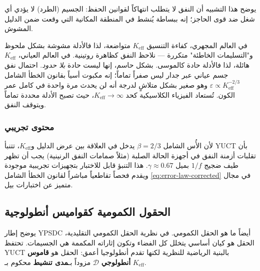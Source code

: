 \documentclass[12pt,a4paper]{article}
\theoremstyle{remark}
\begin{document}
	يوضح هذا التشبيه أن النفق لا يتطلب انتهاكاً لقوانين الحفظ: الجسيم (الطرد) لا يؤدي أي شغل ضد قوى الحاجز؛ إنه ببساطة يُنشط في المنطقة المكانية التي وقعت ضمن الدليل المشوش.
	
	في العالم المجهري، كفاءة التنسيق \(K_{\mathrm{eff}}\) متواضعة، لذا فالأدلة مشوشة بشكل ملحوظ و"التسليمات الخاطئة" متكررة — نلاحظ النفق كظاهرة روتينية. في العالم العياني، \(K_{\mathrm{eff}}\) هائلة، لذا فالأدلة حادة كالموسى. بشكل حاسم، إنها ليست حادة \emph{بلا حدود}. احتمال نفق جسم عياني عبر جدار ليس صفراً تماماً؛ إنه مكبوت أسياً بقانون الخطأ الشامل \(\varepsilon \propto K_{\mathrm{eff}}^{-2/3}\) وهو صغير بشكل متلاشٍ لدرجة أنه لن يحدث مرة واحدة في كامل عمر الكون. تُستعاد الفيزياء الكلاسيكية كحد \(K_{\mathrm{eff}} \to \infty\)، حيث تصبح الأدلة محددة تماماً ويتوقف النفق.
	
	\subsubsection{محتوى تجريبي}
	
	لأن الأُس الشامل \(\beta=2/3\) يدخل في العلاقة بين عرض الدليل و\(K_{\mathrm{eff}}\)، تتنبأ YUCT بأن تقلبات أزمنة النفق في أجهزة الحالة الصلبة (مثلاً صمامات النفق الرنينية) يجب أن تظهر طيف ضجيج \(1/f\) بميل \(\gamma \approx 0.67\). هذا التنبؤ قابل للاختبار بتجهيزات تجريبية موجودة ويقدم فحصاً تقاطعياً مباشراً لقانون الخطأ الشامل \eqref{eq:error-law-corrected} في مجال متميز عن اختبارات بيل.
	
	\medskip
	
	\subsection{الحقول الكمومية كقواميس أنطولوجية}
	
	يوضح إطار YPSDC أيضاً ما هو الحقل الكمومي. في نظرية الحقل الكمومي التقليدية، الحقل هو كيان أساسي يتخلل كل الفضاء وتكون إثاراته المكممة هي الجسيمات. تحتفظ YUCT بالبنية الرياضية للنظرية لكنها تقدم أنطولوجيا أعمق: الحقل هو \textbf{قاموس أنطولوجي} \(\mathcal{D}\) مزوداً بـ\textbf{مدى تنشيط} محكوم بـ \(K_{\mathrm{eff}}\).
	
\end{document}
